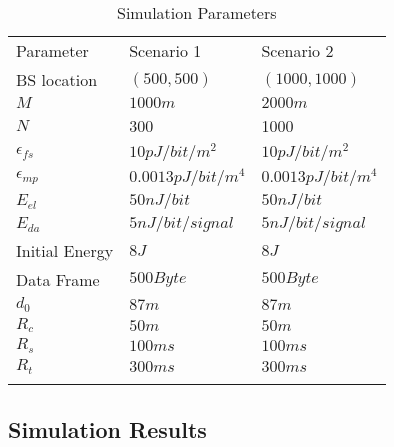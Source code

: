 \documentclass[journal]{IEEEtran}
\begin{document}
\begin{table}[h]
\centering
\caption{Simulation Parameters}
\label{tab:1}       \begin{tabular}{l l l}
\hline\noalign{\smallskip}
Parameter & Scenario 1 & Scenario 2 \\
\noalign{\smallskip}\hline\noalign{\smallskip}
BS location & $(500,500)$ & $(1000,1000)$\\
$M$ & $1000m$ & $2000m$\\
$N$ & 300 & 1000\\
$\epsilon_{fs}$ & $10pJ/bit/m^2$ & $10pJ/bit/m^2$\\
$\epsilon_{mp}$ & $0.0013pJ/bit/m^4$ & $0.0013pJ/bit/m^4$\\
$E_{el}$ & $50nJ/bit$ & $50nJ/bit$\\
$E_{da}$ & $5nJ/bit/signal$ & $5nJ/bit/signal$\\
Initial Energy & $8J$ & $8J$\\
Data Frame & $500Byte$ & $500Byte$\\
$d_{0}$ & $87m$ & $87m$\\
$R_{c}$ & $50m$ & $50m$\\
$R_{s}$ & $100ms$ & $100ms$\\
$R_{t}$ & $300ms$ & $300ms$\\
\noalign{\smallskip}\hline
\end{tabular}
\end{table}


\subsection{Simulation Results}
\label{subsec:sim-res}
\end{document}
